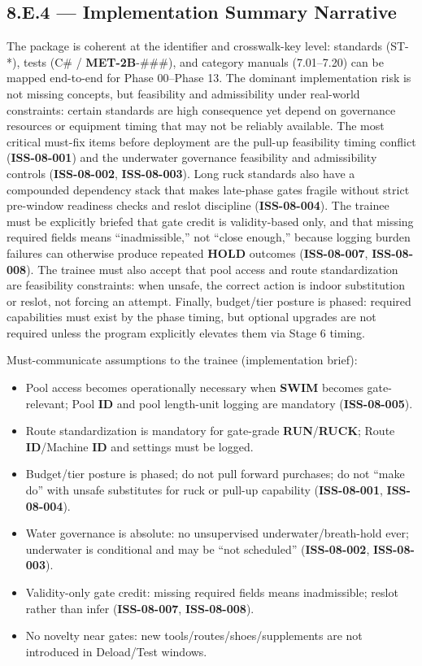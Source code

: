 \documentclass[10pt]{article}
\begin{document}
\subsection*{8.E.4 — Implementation Summary Narrative}
{}

The package is coherent at the identifier and crosswalk-key level: standards (ST-*), tests (C\# / \textbf{MET-2B}-\#\#\#), and category manuals (7.01–7.20) can be mapped end-to-end for Phase 00–Phase 13. The dominant implementation risk is not missing concepts, but feasibility and admissibility under real-world constraints: certain standards are high consequence yet depend on governance resources or equipment timing that may not be reliably available. The most critical must-fix items before deployment are the pull-up feasibility timing conflict (\textbf{ISS-08-001}) and the underwater governance feasibility and admissibility controls (\textbf{ISS-08-002}, \textbf{ISS-08-003}). Long ruck standards also have a compounded dependency stack that makes late-phase gates fragile without strict pre-window readiness checks and reslot discipline (\textbf{ISS-08-004}). The trainee must be explicitly briefed that gate credit is validity-based only, and that missing required fields means “inadmissible,” not “close enough,” because logging burden failures can otherwise produce repeated \textbf{HOLD} outcomes (\textbf{ISS-08-007}, \textbf{ISS-08-008}). The trainee must also accept that pool access and route standardization are feasibility constraints: when unsafe, the correct action is indoor substitution or reslot, not forcing an attempt. Finally, budget/tier posture is phased: required capabilities must exist by the phase timing, but optional upgrades are not required unless the program explicitly elevates them via Stage 6 timing.

Must-communicate assumptions to the trainee (implementation brief):

\begin{itemize}
\item Pool access becomes operationally necessary when \textbf{SWIM} becomes gate-relevant; Pool \textbf{ID} and pool length-unit logging are mandatory (\textbf{ISS-08-005}).
\item Route standardization is mandatory for gate-grade \textbf{RUN}/\textbf{RUCK}; Route \textbf{ID}/Machine \textbf{ID} and settings must be logged.
\item Budget/tier posture is phased; do not pull forward purchases; do not “make do” with unsafe substitutes for ruck or pull-up capability (\textbf{ISS-08-001}, \textbf{ISS-08-004}).
\item Water governance is absolute: no unsupervised underwater/breath-hold ever; underwater is conditional and may be “not scheduled” (\textbf{ISS-08-002}, \textbf{ISS-08-003}).
\item Validity-only gate credit: missing required fields means inadmissible; reslot rather than infer (\textbf{ISS-08-007}, \textbf{ISS-08-008}).
\item No novelty near gates: new tools/routes/shoes/supplements are not introduced in Deload/Test windows.
\end{itemize}
\end{document}
